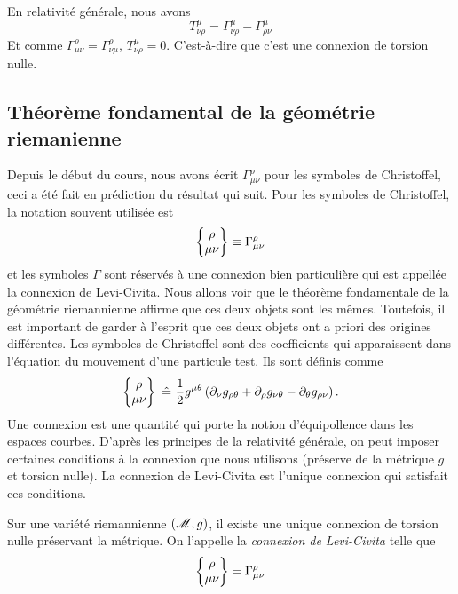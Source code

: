 \documentclass[a4paper,11pt]{report}
\begin{document}
                En relativité générale, nous avons
                \begin{equation}
                    T^\mu_{\nu\rho} = \Gamma^\mu_{\nu\rho} - \Gamma^\mu_{\rho\nu}
                \end{equation}
                Et comme $\Gamma^\rho_{\mu\nu} = \Gamma^\rho_{\nu\mu}$, $T^\mu_{\nu\rho} = 0$. C'est-à-dire que c'est une connexion de torsion nulle.
                
            \subsection{Théorème fondamental de la géométrie riemanienne}
            
                Depuis le début du cours, nous avons écrit $\Gamma^\rho_{\mu\nu}$ pour les symboles de Christoffel, ceci a été fait en prédiction du résultat qui suit. Pour les symboles de Christoffel, la notation souvent utilisée est
                \begin{equation*}
                    \begin{Bmatrix}\rho\\\mu\nu\end{Bmatrix}\equiv
                    \Gamma^\rho_{\mu\nu}
                \end{equation*}
                et les symboles $\Gamma$ sont réservés à une connexion bien particulière qui est appellée la connexion de Levi-Civita. Nous allons voir que le théorème fondamentale de la géométrie riemannienne affirme que ces deux objets sont les mêmes. Toutefois, il est important de garder à l'esprit que ces deux objets ont a priori des origines différentes. Les symboles de Christoffel sont des coefficients qui apparaissent dans l'équation du mouvement d'une particule test. Ils sont définis comme
                \begin{equation}
                    \begin{Bmatrix}\rho\\\mu\nu\end{Bmatrix}~\hat{=}~
                    \frac{1}{2}g^{\mu\theta}\left( \partial_\nu g_{\rho\theta}+\partial_\rho g_{\nu\theta}-\partial_\theta g_{\rho\nu} \right).
                \end{equation}
                Une connexion est une quantité qui porte la notion d'équipollence dans les espaces courbes. D'après les principes de la relativité générale, on peut imposer certaines conditions à la connexion que nous utilisons (préserve de la métrique $g$ et torsion nulle). La connexion de Levi-Civita est l'unique connexion qui satisfait ces conditions.\\
            
                \begin{thm}\begin{leftbar}
                    Sur une variété riemannienne $(\mathscr{M},g)$, il existe une unique connexion de torsion nulle préservant la métrique. On l'appelle la \textit{connexion de Levi-Civita} telle que
                    \begin{equation}
                        \begin{Bmatrix}\rho\\\mu\nu\end{Bmatrix}=\Gamma^\rho_{\mu\nu}
                    \end{equation}
                \end{leftbar}\end{thm}
                
\end{document}
